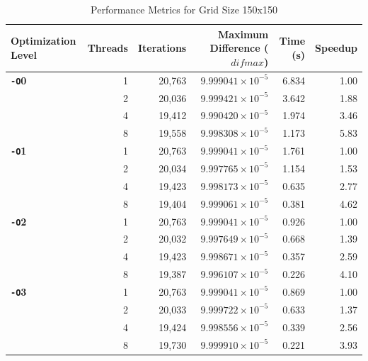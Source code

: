 \documentclass{article}
\begin{document}
\begin{table}[H]
    \centering
    \caption{Performance Metrics for Grid Size 150x150}
    \label{tab:performance_150}
    \begin{tabular}{l r r r r r}
    \toprule
    \textbf{Optimization Level} & \textbf{Threads} & \textbf{Iterations} & \textbf{Maximum Difference ($difmax$)} & \textbf{Time (s)} & \textbf{Speedup} \\
    \midrule
    \textbf{\texttt{-O}0} & 1 & 20,763 & $9.999041 \times 10^{-5}$ & 6.834 & 1.00 \\
        & 2 & 20,036 & $9.999421 \times 10^{-5}$ & 3.642 & 1.88 \\
        & 4 & 19,412 & $9.990420 \times 10^{-5}$ & 1.974 & 3.46 \\
        & 8 & 19,558 & $9.998308 \times 10^{-5}$ & 1.173 & 5.83 \\
    \midrule
    \textbf{\texttt{-O}1} & 1 & 20,763 & $9.999041 \times 10^{-5}$ & 1.761 & 1.00 \\
        & 2 & 20,034 & $9.997765 \times 10^{-5}$ & 1.154 & 1.53 \\
        & 4 & 19,423 & $9.998173 \times 10^{-5}$ & 0.635 & 2.77 \\
        & 8 & 19,404 & $9.999061 \times 10^{-5}$ & 0.381 & 4.62 \\
    \midrule
    \textbf{\texttt{-O}2} & 1 & 20,763 & $9.999041 \times 10^{-5}$ & 0.926 & 1.00 \\
        & 2 & 20,032 & $9.997649 \times 10^{-5}$ & 0.668 & 1.39 \\
        & 4 & 19,423 & $9.998671 \times 10^{-5}$ & 0.357 & 2.59 \\
        & 8 & 19,387 & $9.996107 \times 10^{-5}$ & 0.226 & 4.10 \\
    \midrule
    \textbf{\texttt{-O}3} & 1 & 20,763 & $9.999041 \times 10^{-5}$ & 0.869 & 1.00 \\
        & 2 & 20,033 & $9.999722 \times 10^{-5}$ & 0.633 & 1.37 \\
        & 4 & 19,424 & $9.998556 \times 10^{-5}$ & 0.339 & 2.56 \\
        & 8 & 19,730 & $9.999910 \times 10^{-5}$ & 0.221 & 3.93 \\
    \bottomrule
    \end{tabular}
\end{table}
\end{document}
